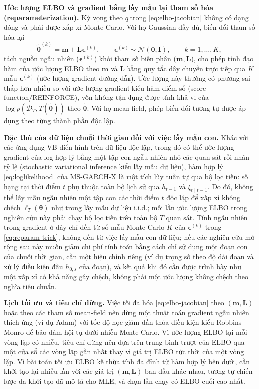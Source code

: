 \documentclass[12pt,a4paper]{article}
\numberwithin{equation}{section}
\newcommand{\bm}[1]{\symbf{#1}}
\newcommand{\Data}{\mathcal{D}}
\newcommand{\Param}{\bm{\theta}}
\begin{document}
\textbf{Ước lượng ELBO và gradient bằng lấy mẫu lại tham số hóa (reparameterization).}
Kỳ vọng theo $q$ trong \cref{eq:elbo-jacobian} không có dạng đóng và phải được xấp xỉ Monte Carlo. Với họ Gaussian đầy đủ, biến đổi tham số hóa lại
\begin{equation}
  \widetilde{\Param}^{(k)}=\bm m+\bm L\bm\epsilon^{(k)},
  \qquad
  \bm\epsilon^{(k)}\sim\mathcal{N}(\bm 0,\bm I),
  \qquad k=1,\ldots,K,
  \label{eq:reparam-trick}
\end{equation}
tách nguồn ngẫu nhiên ($\bm\epsilon^{(k)}$) khỏi tham số biến phân ($\bm m,\bm L$), cho phép tính đạo hàm của ước lượng ELBO theo $\bm m$ và $\bm L$ bằng quy tắc dây chuyền trực tiếp qua $K$ mẫu $\bm\epsilon^{(k)}$ (ước lượng gradient đường dẫn). Ước lượng này thường có phương sai thấp hơn nhiều so với ước lượng gradient kiểu hàm điểm số (score-function/REINFORCE), vốn không tận dụng được tính khả vi của $\log p(\Data_T,T(\widetilde{\Param}))$ theo $\widetilde{\Param}$. Với họ mean-field, phép biến đổi tương tự được áp dụng theo từng thành phần độc lập.

\textbf{Đặc thù của dữ liệu chuỗi thời gian đối với việc lấy mẫu con.} Khác với các ứng dụng VB điển hình trên dữ liệu độc lập, trong đó có thể ước lượng gradient của log-hợp lý bằng một tập con ngẫu nhiên nhỏ các quan sát rồi nhân tỷ lệ (stochastic variational inference kiểu lấy mẫu dữ liệu), hàm hợp lý \cref{eq:loglikelihood} của MS-GARCH-X là một tích lũy tuần tự qua bộ lọc tiến: số hạng tại thời điểm $t$ phụ thuộc toàn bộ lịch sử qua $\bar h_{t-1}$ và $\xi_{t\mid t-1}$. Do đó, không thể lấy mẫu ngẫu nhiên một tập con các thời điểm $t$ độc lập để xấp xỉ không chệch $\ell_T(\Param)$ như trong lấy mẫu dữ liệu i.i.d.; mỗi lần ước lượng ELBO trong nghiên cứu này phải chạy bộ lọc tiến trên toàn bộ $T$ quan sát. Tính ngẫu nhiên trong gradient ở đây chỉ đến từ số mẫu Monte Carlo $K$ của $\bm\epsilon^{(k)}$ trong \cref{eq:reparam-trick}, không đến từ việc lấy mẫu con dữ liệu; nếu các nghiên cứu mở rộng sau này muốn giảm chi phí tính toán bằng cách chỉ sử dụng một đoạn con của chuỗi thời gian, cần một hiệu chỉnh riêng (ví dụ trọng số theo độ dài đoạn và xử lý điều kiện đầu $h_{0,s}$ của đoạn), và kết quả khi đó cần được trình bày như một xấp xỉ có khả năng gây chệch, không phải một ước lượng không chệch theo nghĩa tiêu chuẩn.

\textbf{Lịch tối ưu và tiêu chí dừng.} Việc tối đa hóa \cref{eq:elbo-jacobian} theo $(\bm m,\bm L)$ hoặc theo các tham số mean-field nên dùng một thuật toán gradient ngẫu nhiên thích ứng (ví dụ Adam) với tốc độ học giảm dần thỏa điều kiện kiểu Robbins--Monro để bảo đảm hội tụ dưới nhiễu Monte Carlo. Vì ước lượng ELBO tại mỗi vòng lặp có nhiễu, tiêu chí dừng nên dựa trên trung bình trượt của ELBO qua một cửa sổ các vòng lặp gần nhất thay vì giá trị ELBO tức thời của một vòng lặp. Vì bài toán tối ưu ELBO kế thừa tính đa đỉnh từ hàm hợp lý bên dưới, cần khởi tạo lại nhiều lần với các giá trị $(\bm m,\bm L)$ ban đầu khác nhau, tương tự chiến lược đa khởi tạo đã mô tả cho MLE, và chọn lần chạy có ELBO cuối cao nhất.
\end{document}
